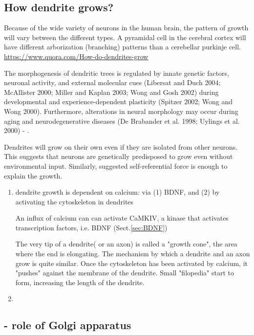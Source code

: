 \subsection{How dendrite grows?}

Because of the wide variety of neurons in the human brain, the pattern of
growth will vary between the different types. A pyramidal cell in the cerebral
cortex will have different arborization (branching) patterns than a cerebellar
purkinje cell.
\url{https://www.quora.com/How-do-dendrites-grow}

The morphogenesis of dendritic trees is regulated by innate genetic factors,
neuronal activity, and external molecular cues (Libersat and Duch 2004;
McAllister 2000; Miller and Kaplan 2003; Wong and Gosh 2002) during
developmental and experience-dependent plasticity (Spitzer 2002; Wong and Wong
2000). Furthermore, alterations in neural morphology may occur during aging and
neurodegenerative diseases (De Brabander et al. 1998; Uylings et al. 2000) -
\citep{evers2004}.


Dendrites will grow on their own even if they are isolated from other neurons.
This suggests that neurons are genetically predisposed to grow even without
environmental input. Similarly, \citep{memelli2013} suggested self-referential
force is enough to explain the growth. 

\begin{enumerate}
  \item dendrite growth is dependent on calcium: via (1) BDNF, and (2) by
  activating the cytoskeleton in dendrites
  
  An influx of calcium can can activate CaMKIV, a kinase that activates
  transcription factors, i.e. BDNF (Sect.\ref{sec:BDNF})
  
  The very tip of a dendrite( or an axon) is called a "growth cone", the area
  where the end is elongating.
  The mechanism by which a dendrite and an axon grow is quite similar. Once
  the cytoskeleton has been activated by calcium, it "pushes" against the
  membrane of the dendrite. Small "filopedia" start to form, increasing the
  length of the dendrite.
  
  \item 
\end{enumerate}

\subsection{- role of Golgi apparatus}

